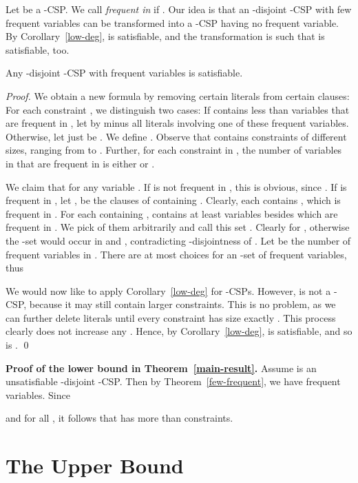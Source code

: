 \documentclass[envcountsect, envcountsame]{llncs}
\begin{document}
Let  be a -CSP. We call  {\em frequent in } if
. Our idea is that an
-disjoint -CSP with few frequent variables can be
transformed into a -CSP  having no frequent
variable. By Corollary~\ref{low-deg},  is satisfiable, and the
transformation is such that  is satisfiable, too.

\begin{theorem}
  Any -disjoint -CSP with  frequent variables is
  satisfiable.
\label{few-frequent}
\end{theorem}

\begin{proof}
  We obtain a new formula  by removing certain literals from
  certain clauses: For each constraint , we distinguish two
  cases: If  contains less than  variables that are frequent
  in , let  by  minus all literals involving one of these
  frequent variables. Otherwise, let  just be .  We define . Observe that  contains constraints of
  different sizes, ranging from  to . Further, for
  each constraint in , the number of variables in 
   that are frequent in  is either  or .
  
  We claim that  for any
  variable . If  is not frequent in , this is obvious, since
  .  If  is frequent in , let ,  be the clauses of  containing .
  Clearly, each  contains , which is frequent in .  For
  each  containing ,  contains at least 
  variables besides  which are frequent in . We pick  of
  them arbitrarily and call this set .  Clearly  for
  , otherwise the -set  would occur in
   and , contradicting -disjointness of .  Let 
  be the number of frequent variables in . There are at most  choices for an -set of frequent
  variables, thus
    
  We would now like to apply Corollary~\ref{low-deg} for
  -CSPs.  However,  is not a -CSP,
  because it may still contain larger constraints. This is no problem,
  as we can further delete literals until every constraint has size
  exactly .  This process clearly does not increase any
  . Hence, by Corollary~\ref{low-deg},  is
  satisfiable, and so is .  \qed
\end{proof}

\textbf{Proof of the lower bound in Theorem~\ref{main-result}.}
Assume  is an unsatisfiable -disjoint -CSP. Then by
Theorem~\ref{few-frequent}, we have
 frequent
variables. Since

and  for all , it follows that  has more than
 constraints.

\section{The Upper Bound}
\end{document}

